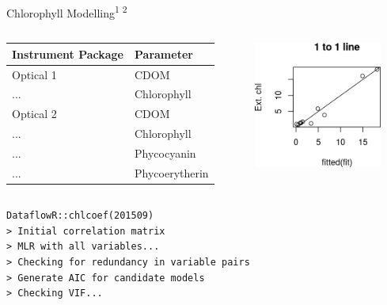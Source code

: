 \documentclass[compress,noflama,nosectionpages]{beamer}
\begin{document}
\begin{frame}{Chlorophyll Modelling\textsuperscript{1 2}}
\vspace{2pt}
	\begin{columns}
		\begin{column}{5cm}
			{\footnotesize
			\begin{tabular}{| l | l |}
				\hline
				Instrument Package & Parameter \\ \hline
				Optical 1 & CDOM \\
				... & Chlorophyll \\ \hline
				Optical 2 & CDOM \\
				... & Chlorophyll \\
				... & Phycocyanin \\
				... & Phycoerytherin \\ \hline
			\end{tabular}
			}
			\end{column}
			\begin{column}{4.5cm}
				\includegraphics[width=4.2cm,keepaspectratio=true]{figures/chl_onetoone.png}
			\end{column}
	\end{columns}
	\small
	\texttt{DataflowR::chlcoef(201509)}\\
	\texttt{> Initial correlation matrix}\\
	\texttt{> MLR with all variables...}\\
	\texttt{> Checking for redundancy in variable pairs}\\
	\texttt{> Generate AIC for candidate models}\\
	\texttt{> Checking VIF...}

\tiny{}
\end{frame}
\end{document}
